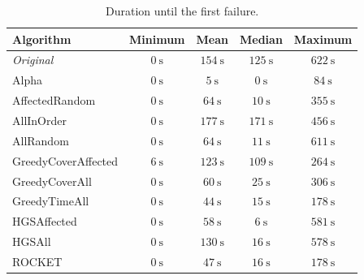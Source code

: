\begin{table}[h]
	\centering
	\begin{tabularx}{\textwidth}{|X||c|c|c|c|}
		\hline
		\textbf{Algorithm} & \textbf{Minimum} & \textbf{Mean} & \textbf{Median} & \textbf{Maximum}\\
		
		\hline
		
		\emph{Original} & $\SI{0}{\second}$ & $\SI{154}{\second}$ & $\SI{125}{\second}$ & $\SI{622}{\second}$\\
		
		\hline
		
		Alpha & $\SI{0}{\second}$ & $\SI{5}{\second}$ & $\SI{0}{\second}$ & $\SI{84}{\second}$\\
		
		\hline
		AffectedRandom & $\SI{0}{\second}$ & $\SI{64}{\second}$ & $\SI{10}{\second}$ & $\SI{355}{\second}$\\
		AllInOrder & $\SI{0}{\second}$ & $\SI{177}{\second}$ & $\SI{171}{\second}$ & $\SI{456}{\second}$\\
		AllRandom & $\SI{0}{\second}$ & $\SI{64}{\second}$ & $\SI{11}{\second}$ & $\SI{611}{\second}$\\
		
		\hline
		
		GreedyCoverAffected & $\SI{6}{\second}$ & $\SI{123}{\second}$ & $\SI{109}{\second}$ & $\SI{264}{\second}$\\
		GreedyCoverAll & $\SI{0}{\second}$ & $\SI{60}{\second}$ & $\SI{25}{\second}$ & $\SI{306}{\second}$\\
		GreedyTimeAll & $\SI{0}{\second}$ & $\SI{44}{\second}$ & $\SI{15}{\second}$ & $\SI{178}{\second}$\\
		
		\hline
		
		HGSAffected & $\SI{0}{\second}$ & $\SI{58}{\second}$ & $\SI{6}{\second}$ & $\SI{581}{\second}$\\
		HGSAll & $\SI{0}{\second}$ & $\SI{130}{\second}$ & $\SI{16}{\second}$ & $\SI{578}{\second}$\\
		
		\hline
		
		ROCKET & $\SI{0}{\second}$ & $\SI{47}{\second}$ & $\SI{16}{\second}$ & $\SI{178}{\second}$\\
		
		\hline
	\end{tabularx}
	\caption{Duration until the first failure.}
	\label{tbl:rq4-first-failure-duration}
\end{table}

